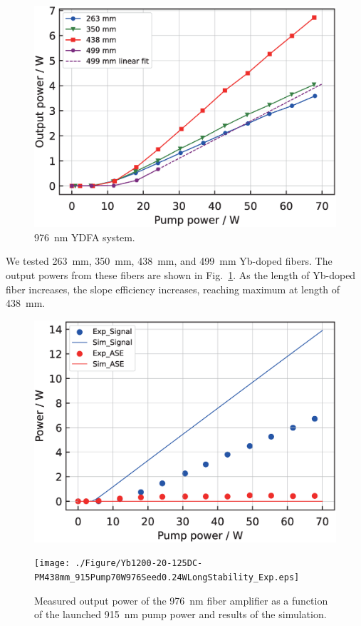 \documentclass{osa-article}
\begin{document}
\begin{figure}[h!]
  \centering\includegraphics[width=0.8\linewidth]{./Figure/Yb1200-20-125DC-PM_OutputComparisonByLength_915Pump976Seed_Exp.eps}
  \caption{\SI{976}{\nm} YDFA system.}
  \label{fig:OutputComparisonOf976YDFA}
\end{figure}

We tested \SI{263}{mm}, \SI{350}{mm}, \SI{438}{mm}, and \SI{499}{mm} Yb-doped fibers.
The output powers from these fibers are shown in Fig.~\ref{fig:OutputComparisonOf976YDFA}.
As the length of Yb-doped fiber increases, the slope efficiency increases, reaching maximum at length of \SI{438}{mm}.


\begin{figure}[h!]
  \begin{minipage}[b]{0.5\linewidth}
    \centering
    \includegraphics[keepaspectratio, width=0.9\linewidth]{./Figure/Yb1200-20-125DC-PM438mm_915Pump976Seed0.24W.eps}
    \subcaption{}
  \end{minipage}
  \begin{minipage}[b]{0.5\linewidth}
    \centering
    \texttt{[image: ./Figure/Yb1200-20-125DC-PM438mm\_915Pump70W976Seed0.24WLongStability\_Exp.eps]}
    \subcaption{}
  \end{minipage}
  \caption{Measured output power of the \SI{976}{nm} fiber amplifier as a function of the launched \SI{915}{nm} pump power and results of the simulation.}
  \label{fig:Result976YDFA}
\end{figure}
\end{document}
